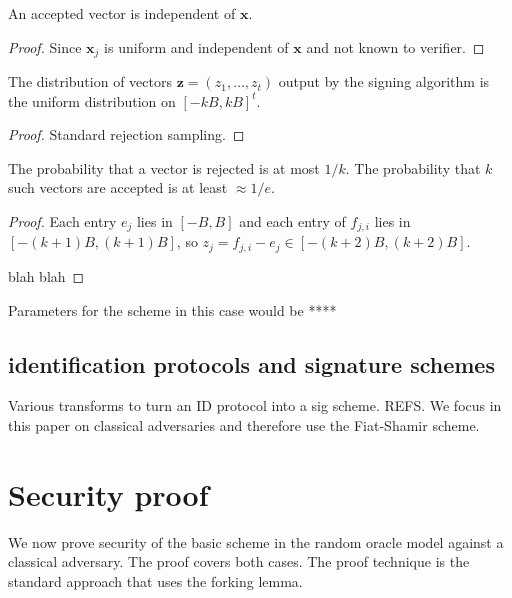 \documentclass{llncs}
\newcommand{\e}{\textbf{x}}
\newcommand{\f}{\textbf{x}}
\newcommand{\z}{\textbf{z}}
\begin{document}
\begin{lemma}
An accepted vector is independent of $\e$.
\end{lemma}

\begin{proof}
Since $\f_j$ is uniform and independent of $\e$ and not known to verifier.
\end{proof}


\begin{lemma} \label{lem:sim2}
The  distribution of vectors $\z = (z_1, \dots, z_t) $ output by the signing algorithm is the uniform distribution on $[-kB,kB]^t$.
\end{lemma}

\begin{proof}
Standard rejection sampling.
\end{proof}


\begin{lemma}
The probability that a vector is rejected is at most $1/k$.
The probability that $k$ such vectors are accepted is at least $ \approx 1/e$.
\end{lemma}

\begin{proof}
Each entry $e_j$ lies in $[-B,B]$ and each entry of $f_{j,i}$ lies in $[-(k+1)B, (k+1)B]$,
so $z_j = f_{j,i} - e_j \in [-(k+2)B, (k+2)B]$.

blah blah
\end{proof}


Parameters for the scheme in this case would be ****




\subsection{identification protocols and signature schemes}

Various transforms to turn an ID protocol into a sig scheme.
REFS.
We focus in this paper on classical adversaries and therefore use the Fiat-Shamir scheme.



\section{Security proof}


We now prove security of the basic scheme in the random oracle model against a classical adversary. The proof covers both cases.
The proof technique is the standard approach that uses the forking lemma.
\end{document}

